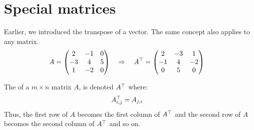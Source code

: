 \documentclass{ximera}
\begin{document}
\section{Special matrices}
Earlier, we introduced the transpose of a vector. The same concept
also applies to any matrix.
\[
A = \begin{pmatrix}
2 & -1 & 0\\
-3 & 4 & 5\\
1 & -2 & 0
\end{pmatrix}
\quad\Rightarrow\quad
A^{\top} = \begin{pmatrix}
2 & -3 & 1\\
-1 & 4 & -2\\
0& 5 & 0
\end{pmatrix}
\]
\begin{definition} The  of a $m\times n$ matrix $A$, is denoted $A^\top$ where:
  \[
  A^\top_{i,j} = A_{j,i}
  \]
 Thus, the first row of $A$ becomes the first column of
  $A^{\top}$ and the second row of $A$ becomes the second column
 of $A^{\top}$ and so on.
\end{definition}
\end{document}
